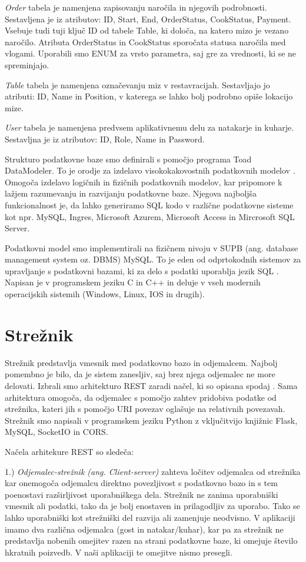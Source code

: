 \documentclass[a4paper, 12pt]{book}
\begin{document}
\textit{Order} tabela je namenjena zapisovanju naročila in njegovih podrobnosti. Sestavljena je iz atributov: ID, Start, End, OrderStatus, CookStatus, Payment. Vsebuje tudi tuji ključ ID od tabele Table, ki določa, na katero mizo je vezano naročilo. Atributa OrderStatus in CookStatus sporočata statusa naročila med vlogami. Uporabili smo ENUM za vrsto parametra, saj gre za vrednosti, ki se ne spreminjajo.

\textit{Table} tabela je namenjena označevanju miz v restavracijah. Sestavljajo jo atributi: ID, Name in Position, v katerega se lahko bolj podrobno opiše lokacijo mize.

\textit{User} tabela je namenjena predvsem aplikativnemu delu za natakarje in kuharje. Sestavljna je iz atributov: ID, Role, Name in Password. 

Strukturo podatkovne baze smo definirali s pomočjo programa Toad DataModeler. To je orodje za izdelavo visokokakovostnih podatkovnih modelov \cite{Toad_Data_Modeler}. Omogoča izdelavo logičnih in fizičnih podatkovnih modelov, kar pripomore k lažjem razumevanju in razvijanju podatkovne baze. Njegova najboljša funkcionalnost je, da lahko generiramo SQL kodo v različne podatkovne sisteme kot npr. MySQL, Ingres, Microsoft Azurem, Microsoft Access in Mircrosoft SQL Server.

Podatkovni model smo implementirali na fizičnem nivoju v SUPB  (ang. database management system oz. DBMS) MySQL. To je eden od odprtokodnih sistemov za upravljanje s podatkovni bazami, ki za delo s podatki uporablja jezik SQL \cite{MySQL}. Napisan je v programskem jeziku C in C++ in deluje v vseh modernih operacijskih sistemih (Windows, Linux, IOS in drugih).


\section{Strežnik}
Strežnik predstavlja vmesnik med podatkovno bazo in odjemalcem. Najbolj pomembno je bilo, da je sistem zanesljiv, saj brez njega odjemalec ne more delovati. Izbrali smo arhitekturo REST zaradi načel, ki so opisana spodaj \cite{RESTAPI}. Sama arhitektura omogoča, da odjemalec s pomočjo zahtev pridobiva podatke od strežnika, kateri jih s pomočjo URI povezav oglašuje na relativnih povezavah. Strežnik smo napisali v programskem jeziku Python z vključitvijo knjižnic Flask, MySQL, SocketIO in CORS.

Načela arhitekure REST so sledeča:

1.)\textit{ Odjemalec-strežnik (ang. Client-server)} zahteva ločitev odjemalca od strežnika kar onemogoča odjemalcu direktno povezljivost s podatkovno bazo in s tem poenostavi razširljivost uporabniškega dela. Strežnik ne zanima uporabniški vmesnik ali podatki, tako da je bolj enostaven in prilagodljiv za uporabo. Tako se lahko uporabniški kot strežniški del razvija ali zamenjuje neodvisno. V aplikaciji imamo dva različna odjemalca (gost in natakar/kuhar), kar pa za strežnik ne predstavlja nobenih omejitev razen na strani podatkovne baze, ki omejuje število hkratnih poizvedb. V naši aplikaciji te omejitve nismo presegli.
\end{document}
